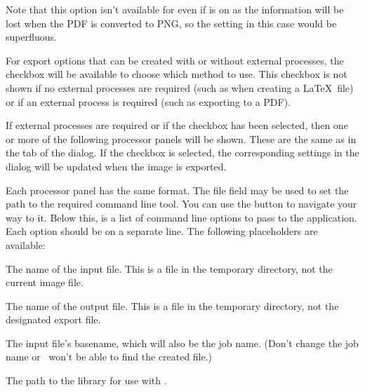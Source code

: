 Note that this option isn't available for  even
if  is on as the information will be lost
when the PDF is converted to PNG, so the setting in this case would
be superfluous.


For export options that can be created with or without external
processes, the  checkbox will be
available to choose which method to use. This checkbox is not
shown if no external processes are required (such as when creating a
\LaTeX\ file) or if an external process is required (such as
exporting to a PDF).


If external processes are required or if the
 checkbox has been selected, then one or
more of the following processor panels will be shown. These are the
same as in the  tab of the 
dialog.
If the  checkbox is selected, the
corresponding settings in the  dialog will be
updated when the image is exported.

Each processor panel has the same format. The file field may be used
to set the path to the required command line tool. You can use the
 button to navigate your way to it. Below this, is
a list of command line options to pass to the application. Each
option should be on a separate line. The following placeholders are
available:
\begin{deflist}

\begin{itemdesc}
The name of the input file. This is a file in the temporary
directory, not the current image file.
\end{itemdesc}


\begin{itemdesc}
The name of the output file. This is a file in the temporary
directory, not the designated export file.
\end{itemdesc}


\begin{itemdesc}
The input file's basename, which will also be the job name. (Don't change
the job name or \FlowframTk\ won't be able to find the created file.)
\end{itemdesc}


\begin{itemdesc}
The path to the  library for use with .
\end{itemdesc}

\end{deflist}

